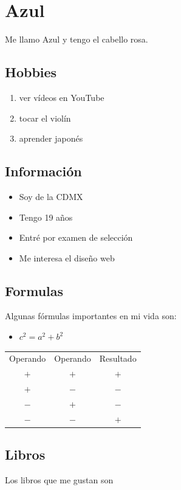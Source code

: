 \chapter{Azul}
Me llamo Azul y tengo el cabello rosa.

\section{Hobbies}

\begin{enumerate}
\item ver vídeos en YouTube
\item tocar el violín
\item aprender japonés
\end {enumerate}

\section{Información}

\begin{itemize}
\item Soy de la CDMX
\item Tengo 19 años
\item Entré por examen de selección
\item Me interesa el diseño web
\end{itemize}

\section{Formulas}
Algunas fórmulas importantes en mi vida son:
\begin{itemize}
\item $c^2=a^2+b^2$
\end{itemize}
  
\begin{table}[h]
  \centering
  \begin{tabular}{|c c c|}
    \hline
    Operando & Operando & Resultado\\
    $+$ & $+$ & $+$\\\hline
    $+$ & $-$ & $-$\\\hline
    $-$ & $+$ & $-$\\\hline
    $-$ & $-$ & $+$\\\hline
\end{tabular}
\end{table}

\section{Libros}
Los libros que me gustan son~\cite{salinger2001guardian, rice2014entrevista, shelley2008frankenstein, marias2011corazon}

